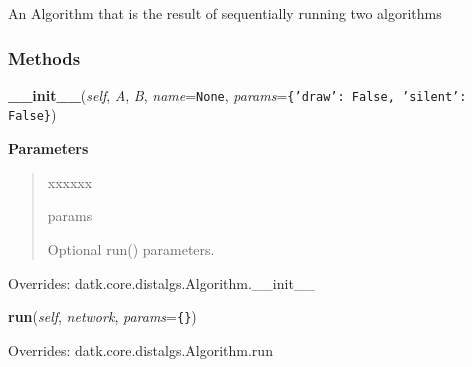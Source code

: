 An Algorithm that is the result of sequentially running two algorithms



  \subsubsection{Methods}

    \vspace{0.5ex}

\hspace{.8\funcindent}\begin{boxedminipage}{\funcwidth}

    \raggedright \textbf{\_\_init\_\_}(\textit{self}, \textit{A}, \textit{B}, \textit{name}={\tt None}, \textit{params}={\tt \texttt{\{}\texttt{'}\texttt{draw}\texttt{'}\texttt{: }False\texttt{, }\texttt{'}\texttt{silent}\texttt{'}\texttt{: }False\texttt{\}}})

\setlength{\parskip}{2ex}
\setlength{\parskip}{1ex}
      \textbf{Parameters}
      \vspace{-1ex}

      \begin{quote}
        \begin{Ventry}{xxxxxx}

          \item[params]

          Optional run() parameters.

        \end{Ventry}

      \end{quote}

      Overrides: datk.core.distalgs.Algorithm.\_\_init\_\_

    \end{boxedminipage}

    \vspace{0.5ex}

\hspace{.8\funcindent}\begin{boxedminipage}{\funcwidth}

    \raggedright \textbf{run}(\textit{self}, \textit{network}, \textit{params}={\tt \texttt{\{}\texttt{\}}})

\setlength{\parskip}{2ex}
\setlength{\parskip}{1ex}
      Overrides: datk.core.distalgs.Algorithm.run

    \end{boxedminipage}

